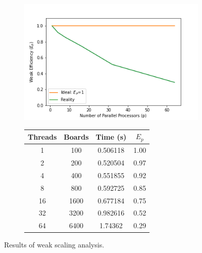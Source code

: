 \documentclass[12pt]{article}
\begin{document}
\begin{figure}[H]
    \centering
    \begin{subfigure}[c]{0.55\textwidth}
        \centering
        \includegraphics[width=\textwidth]{plots/weak_scaling.png}
    \end{subfigure}
    \hfill
    \begin{subfigure}[c]{0.44\textwidth}
        \centering
        \begin{tabular}{||cccc||} 
            \hline
            Threads & Boards & Time (s) & $E_p$\\ %
            \hline\hline
            1 & 100 & 0.506118 & 1.00 \\ 
            \hline
            2 & 200 & 0.520504 & 0.97 \\
            \hline
            4 & 400 & 0.551855 & 0.92\\
            \hline
            8 & 800 & 0.592725 & 0.85\\
            \hline
            16 & 1600 & 0.677184 & 0.75 \\
            \hline
            32 & 3200 & 0.982616 & 0.52\\
            \hline
            64 & 6400 & 1.74362 & 0.29\\ %
            \hline
        \end{tabular}
    \end{subfigure}
    \caption{Results of weak scaling analysis.}
\end{figure}
\end{document}
